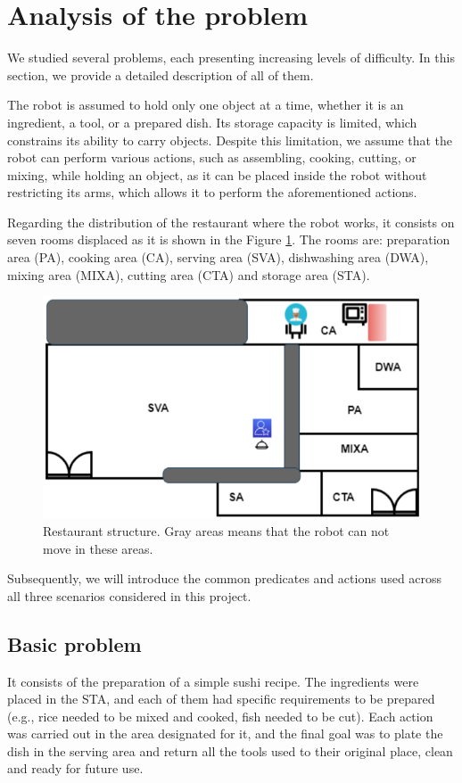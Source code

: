 \section{Analysis of the problem}

We studied several problems, each presenting increasing levels of difficulty. In this section, we provide a detailed description of 
all of them. 

The robot is assumed to hold only one object at a time, whether it is an ingredient, a tool, or a prepared dish. Its storage capacity is
 limited, which constrains its ability to carry objects. Despite this limitation, we assume that the robot can perform various actions,
  such as assembling, cooking, cutting, or mixing, while holding an object, as it can be placed inside the robot without restricting its
   arms, which allows it to perform the aforementioned actions.

Regarding the distribution of the restaurant where the robot works, it consists on seven rooms displaced as it is shown in the Figure 
\ref{fig:restaurant}. The rooms are: preparation area (PA), cooking area (CA), serving area (SVA), dishwashing area (DWA),
 mixing area (MIXA), cutting area (CTA) and storage area (STA).


\begin{figure}[h]
  \centering
  \includegraphics[width=0.5\linewidth]{restaurante.png}
  \caption{Restaurant structure. Gray areas means that the robot can not move in these areas.}
  \label{fig:restaurant}
\end{figure}

Subsequently, we will introduce the common predicates and actions used across all three scenarios considered in this project.
\subsection{Basic problem}\label{subsec:basic}
It consists of the preparation of a simple sushi recipe. The ingredients were placed in the STA, and each of them had specific 
requirements to be prepared (e.g., rice needed to be mixed and cooked, fish needed to be cut). Each action was carried out in the 
area designated for it, and the final goal was to plate the dish in the serving area and return all the tools used to their original
 place, clean and ready for future use.

